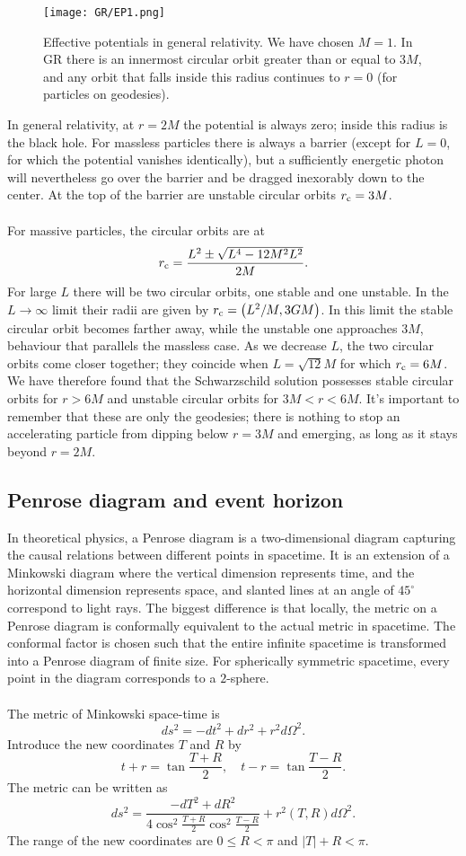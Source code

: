 \documentclass[cyan]{elegantnote}
\begin{document}
\begin{figure}
\centering
\texttt{[image: GR/EP1.png]}
\caption{Effective potentials in general relativity. We have chosen $M = 1$. In GR there is an innermost circular orbit greater than or equal to $3M$, and any orbit that falls inside this radius continues to $r = 0$ (for particles on geodesies).}
\end{figure}

\noindent
In general relativity, at $r = 2M$ the potential is always zero; inside this radius is the black hole.
For massless particles there is always a barrier (except for $L = 0$, for which the potential vanishes identically), but a sufficiently energetic photon will  nevertheless go over the barrier and be dragged inexorably down to the center. At the top of the barrier are unstable circular orbits $r_{\rm c} = 3M$.
\\ \\
For massive particles, the circular orbits are at
\[r_{\rm c} = \frac{L^2 \pm \sqrt{L^4-12M^2L^2}}{2M}.\]
For large $L$ there will be two circular orbits, one stable and one unstable. In the $L \to \infty$ limit their radii are given by $r_{\rm c} = \left(L^2/M, 3GM \right)$.
In this limit the stable circular orbit becomes farther away, while the unstable one approaches $3M$, behaviour that parallels the massless case. As we decrease $L$,
the two circular orbits come closer together; they coincide when $L = \sqrt{12}M$ for which $r_{\rm c} = 6M$. We have therefore found that the Schwarzschild solution possesses stable circular orbits for $r > 6M$ and unstable circular orbits for $3M < r < 6M$. 
It's important to remember that these are only the geodesies; there is nothing to stop an accelerating particle from dipping below $r = 3M$ and emerging, as long as it stays beyond $r = 2M$.

\subsection{Penrose diagram and event horizon}
In theoretical physics, a Penrose diagram is a two-dimensional diagram capturing the causal relations between different points in spacetime. 
It is an extension of a Minkowski diagram where the vertical dimension represents time, and the horizontal dimension represents space, and slanted lines at an angle of $45^{\circ}$ correspond to light rays. 
The biggest difference is that locally, the metric on a Penrose diagram is conformally equivalent to the actual metric in spacetime. 
The conformal factor is chosen such that the entire infinite spacetime is transformed into a Penrose diagram of finite size. 
For spherically symmetric spacetime, every point in the diagram corresponds to a $2$-sphere.
\\ \\
The metric of Minkowski space-time is 
\[ds^2 = -dt^2 + dr^2 + r^2 d\Omega^2.\]
Introduce the new coordinates $T$ and $R$ by 
\[t + r = \tan \frac{T+R}{2} ,\quad t - r = \tan \frac{T-R}{2}.\]
The metric can be written as
\[ds^2 = \frac{-dT^2+dR^2}{4\cos^2\frac{T+R}{2} \cos^2 \frac{T-R}{2}} + r^2(T,R) d\Omega^2.\]
The range of the new coordinates are $0 \leq R < \pi$ and  $|T| + R < \pi$.
\end{document}
